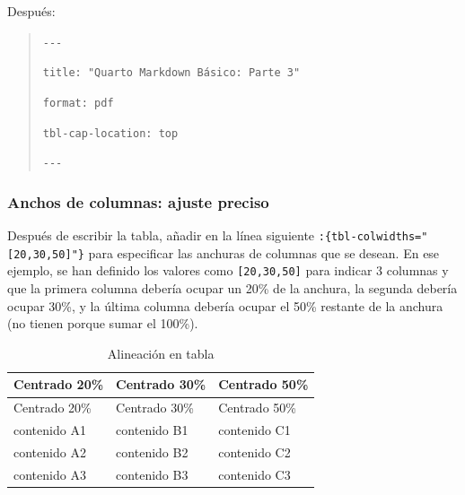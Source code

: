 \documentclass[
  letterpaper,
  DIV=11,
  numbers=noendperiod]{scrartcl}
\begin{document}
Después:

\begin{quote}
\texttt{-\/-\/-}

\texttt{title:\ "Quarto\ Markdown\ Básico:\ Parte\ 3"}

\texttt{format:\ pdf}

\texttt{tbl-cap-location:\ top}

\texttt{-\/-\/-}
\end{quote}

\subsubsection{Anchos de columnas: ajuste
preciso}\label{anchos-de-columnas-ajuste-preciso}

Después de escribir la tabla, añadir en la línea siguiente
\texttt{:\{tbl-colwidths="{[}20,30,50{]}"\}} para especificar las
anchuras de columnas que se desean. En ese ejemplo, se han definido los
valores como \texttt{{[}20,30,50{]}} para indicar 3 columnas y que la
primera columna debería ocupar un 20\% de la anchura, la segunda debería
ocupar 30\%, y la última columna debería ocupar el 50\% restante de la
anchura (no tienen porque sumar el 100\%).

\begin{longtable}[]{@{}
  >{\centering\arraybackslash}p{}
  >{\centering\arraybackslash}p{}
  >{\centering\arraybackslash}p{}@{}}
\caption{Alineación en tabla}\tabularnewline
\toprule\noalign{}
\begin{minipage}[b]{\linewidth}\centering
Centrado 20\%
\end{minipage} & \begin{minipage}[b]{\linewidth}\centering
Centrado 30\%
\end{minipage} & \begin{minipage}[b]{\linewidth}\centering
Centrado 50\%
\end{minipage} \\
\midrule\noalign{}
\endfirsthead
\toprule\noalign{}
\begin{minipage}[b]{\linewidth}\centering
Centrado 20\%
\end{minipage} & \begin{minipage}[b]{\linewidth}\centering
Centrado 30\%
\end{minipage} & \begin{minipage}[b]{\linewidth}\centering
Centrado 50\%
\end{minipage} \\
\midrule\noalign{}
\endhead
\bottomrule\noalign{}
\endlastfoot
contenido A1 & contenido B1 & contenido C1 \\
contenido A2 & contenido B2 & contenido C2 \\
contenido A3 & contenido B3 & contenido C3 \\
\end{longtable}
\end{document}
